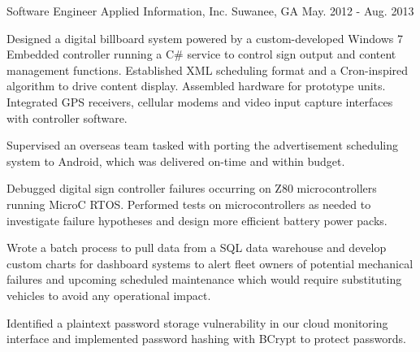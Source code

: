 \begin{cventries}
  \cventry
    {Software Engineer} %
    {Applied Information, Inc.} %
    {Suwanee, GA} %
    {May. 2012 - Aug. 2013} %
    {
      \begin{cvitems} %
        \item {Designed a digital billboard system powered by a custom-developed Windows 7 Embedded controller running a C\# service to control sign output and content management functions. Established XML scheduling format and a Cron-inspired algorithm to drive content display. Assembled hardware for prototype units. Integrated GPS receivers, cellular modems and video input capture interfaces with controller software.}
        \item {Supervised an overseas team tasked with porting the advertisement scheduling system to Android, which was delivered on-time and within budget.}
        \item {Debugged digital sign controller failures occurring on Z80 microcontrollers running MicroC RTOS. Performed tests on microcontrollers as needed to investigate failure hypotheses and design more efficient battery power packs.}
        \item {Wrote a batch process to pull data from a SQL data warehouse and develop custom charts for dashboard systems to alert fleet owners of potential mechanical failures and upcoming scheduled maintenance which would require substituting vehicles to avoid any operational impact.}
        \item {Identified a plaintext password storage vulnerability in our cloud monitoring interface and implemented password hashing with BCrypt to protect passwords.}
      \end{cvitems}
    }

\end{cventries}
